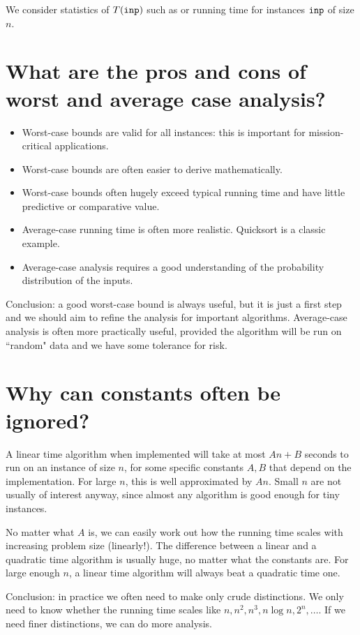 We consider statistics of $T(\inp)$ such as   or 
 running time for instances $\inp$ of size $n$.


\section*{What are the pros and cons of worst and average case analysis?}
\begin{itemize}
\item Worst-case bounds are valid for all instances: 
this is important for mission-critical applications.
\item Worst-case bounds are often easier to derive mathematically.
\item Worst-case bounds often hugely exceed typical running time and 
have little predictive or comparative value. 
\item Average-case running time is often more realistic. Quicksort is a classic 
example.
\item Average-case analysis requires a good understanding of the probability 
distribution of the inputs.
\end{itemize}
Conclusion: a good worst-case bound is always useful, but it is
just a first step and we should aim to refine the analysis for important 
algorithms. Average-case analysis is often more practically useful, provided the
 algorithm will be run on ``random" data and we have some tolerance for risk.

\section*{Why can constants often be ignored?}

A linear time algorithm when implemented will take at most $A
n + B$ seconds to run on an instance of size $n$, for some
specific constants $A, B$ that depend on the implementation. For large $n$, this is well approximated by $A n$. 
Small $n$ are not usually of interest anyway, since almost any algorithm is good
 enough for tiny instances. 
 
No matter what $A$ is, we can easily work out how the running time
scales with increasing problem size (linearly!). The difference between a linear and a quadratic time algorithm is
usually huge, no matter what the constants are. For large enough $n$, a
linear time algorithm will always beat a quadratic time one. 

Conclusion: in practice we often need to make only crude
distinctions. We only need to know whether the running time scales like 
$n, n^2, n^3, n \log n, 2^n, \dots$. If we need finer distinctions, we 
can do more analysis.



